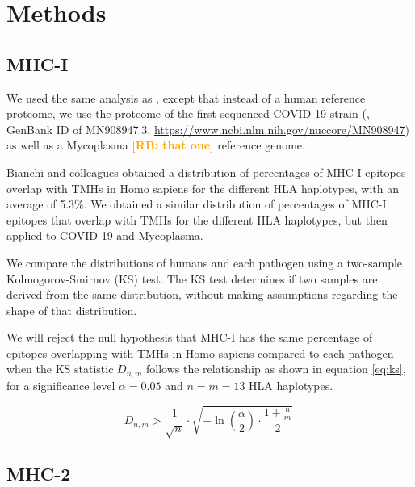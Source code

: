 \documentclass{article}
\newcommand{\richel}[1]{\textcolor{orange}{\textbf{[RB: #1]}}}
\begin{document}
\section{Methods}

\subsection{MHC-I}

We used the same analysis as \cite{bianchi2017},
except that instead of a human reference proteome,
we use the proteome of the first sequenced COVID-19 strain (\cite{wu2020new},
GenBank ID of MN908947.3, \url{https://www.ncbi.nlm.nih.gov/nuccore/MN908947})
as well as a Mycoplasma \richel{that one} reference genome.

Bianchi and colleagues obtained a distribution of 
percentages of MHC-I epitopes overlap with TMHs in Homo sapiens
for the different HLA haplotypes, with an average of 5.3\%.
We obtained a similar distribution of percentages of MHC-I epitopes that 
overlap with TMHs for the different HLA haplotypes, but then applied to
COVID-19 and Mycoplasma.

We compare the distributions of humans and each pathogen
using a two-sample 
Kolmogorov-Smirnov (KS) test. The KS test determines if two samples
are derived from the same distribution, without making assumptions
regarding the shape of that distribution. 

We will reject
the null hypothesis that MHC-I has the same percentage of epitopes 
overlapping with TMHs in Homo sapiens compared to each pathogen when 
the KS statistic $D_{n,m}$ follows the relationship as shown in 
equation \ref{eq:ks}, for a significance level $\alpha = 0.05$
and $n = m = 13$ HLA haplotypes.

\begin{equation}
   D_{n,m} > \frac{1}{\sqrt{n}} \cdot \sqrt{ -\ln(\frac{\alpha}{2}) \cdot \frac{1 + \frac{n}{m}}{2} }
\  \label{eq:ks}
\end{equation}

\subsection{MHC-2}
\end{document}
